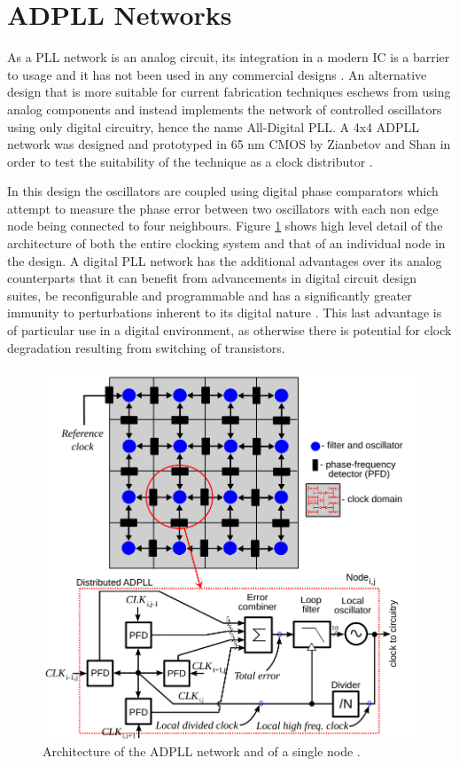 \documentclass[11pt,english,british]{report}
\begin{document}
\section{ADPLL Networks}
As a PLL network is an analog circuit, its integration in a modern IC is a barrier to usage and it has not been used in any commercial designs \cite{zianbetov2013distributed}. An alternative design that is more suitable for current fabrication techniques eschews from using analog components and instead implements the network of controlled oscillators using only digital circuitry, hence the name All-Digital PLL. A 4x4 ADPLL network was designed and prototyped in 65 nm CMOS by Zianbetov and Shan in order to test the suitability of the technique as a clock distributor \cite{zianbetov2013phd,shan2014phd}. %

In this design the oscillators are coupled using digital phase comparators which attempt to measure the phase error between two oscillators with each non edge node being connected to four neighbours. Figure \ref{fig:eldar_node} shows high level detail of the architecture of both the entire clocking system and that of an individual node in the design. A digital PLL network has the additional advantages over its analog counterparts that it can benefit from advancements in digital circuit design suites, be reconfigurable and programmable and has a significantly greater immunity to perturbations inherent to its digital nature \cite{zianbetov2013phd}. This last advantage is of particular use in a digital environment, as otherwise there is potential for clock degradation resulting from switching of transistors.
\begin{figure}[h]
	\centering
	\includegraphics[scale=0.35]{../ccirc_2013_arch}
	\caption{Architecture of the ADPLL network and of a single node \cite{zianbetov2013distributed}.}
	\label{fig:eldar_node}
\end{figure}
\end{document}
